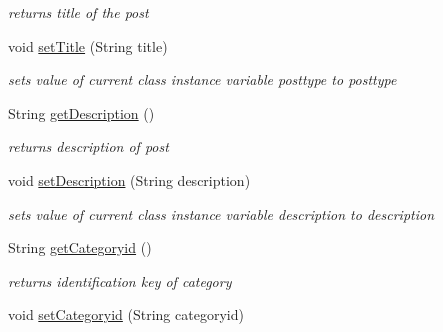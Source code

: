 \begin{DoxyCompactItemize}
\begin{DoxyCompactList}\small\item\em returns title of the post \end{DoxyCompactList}\item 
void \hyperlink{classcom_1_1example_1_1sel_1_1lostfound_1_1UserPost_a97ad31f4a915d4ca9611f2b781e60f96}{set\+Title} (String title)\hypertarget{classcom_1_1example_1_1sel_1_1lostfound_1_1UserPost_a97ad31f4a915d4ca9611f2b781e60f96}{}\label{classcom_1_1example_1_1sel_1_1lostfound_1_1UserPost_a97ad31f4a915d4ca9611f2b781e60f96}

\begin{DoxyCompactList}\small\item\em sets value of current class instance variable posttype to posttype \end{DoxyCompactList}\item 
String \hyperlink{classcom_1_1example_1_1sel_1_1lostfound_1_1UserPost_a1310c639b4bf549b804d5ac5f46ca571}{get\+Description} ()\hypertarget{classcom_1_1example_1_1sel_1_1lostfound_1_1UserPost_a1310c639b4bf549b804d5ac5f46ca571}{}\label{classcom_1_1example_1_1sel_1_1lostfound_1_1UserPost_a1310c639b4bf549b804d5ac5f46ca571}

\begin{DoxyCompactList}\small\item\em returns description of post \end{DoxyCompactList}\item 
void \hyperlink{classcom_1_1example_1_1sel_1_1lostfound_1_1UserPost_a1f7260a82ead3b576888de9ae9e9a8a0}{set\+Description} (String description)\hypertarget{classcom_1_1example_1_1sel_1_1lostfound_1_1UserPost_a1f7260a82ead3b576888de9ae9e9a8a0}{}\label{classcom_1_1example_1_1sel_1_1lostfound_1_1UserPost_a1f7260a82ead3b576888de9ae9e9a8a0}

\begin{DoxyCompactList}\small\item\em sets value of current class instance variable description to description \end{DoxyCompactList}\item 
String \hyperlink{classcom_1_1example_1_1sel_1_1lostfound_1_1UserPost_ae3df884a795d2fea3730020c162acf8c}{get\+Categoryid} ()\hypertarget{classcom_1_1example_1_1sel_1_1lostfound_1_1UserPost_ae3df884a795d2fea3730020c162acf8c}{}\label{classcom_1_1example_1_1sel_1_1lostfound_1_1UserPost_ae3df884a795d2fea3730020c162acf8c}

\begin{DoxyCompactList}\small\item\em returns identification key of category \end{DoxyCompactList}\item 
void \hyperlink{classcom_1_1example_1_1sel_1_1lostfound_1_1UserPost_a27de2d7f2b62da17bf46f3cd3e173139}{set\+Categoryid} (String categoryid)\hypertarget{classcom_1_1example_1_1sel_1_1lostfound_1_1UserPost_a27de2d7f2b62da17bf46f3cd3e173139}{}\label{classcom_1_1example_1_1sel_1_1lostfound_1_1UserPost_a27de2d7f2b62da17bf46f3cd3e173139}


\end{DoxyCompactItemize}
